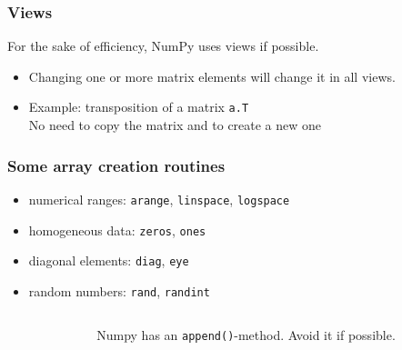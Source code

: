 \begin{frame}[fragile]\frametitle{Views}
 For the sake of efficiency, NumPy uses views if possible.

 \begin{itemize}
  \item Changing one or more matrix elements will change it in all views.
  \item Example: transposition of a matrix \lstinline{a.T}\\
        No need to copy the matrix and to create a new one
 \end{itemize}

\end{frame}

\begin{frame}[fragile]\frametitle{Some array creation routines}

 \begin{itemize}
  \item numerical ranges:
        \lstinline{arange}, \lstinline{linspace}, \lstinline{logspace}
  \item homogeneous data:
        \lstinline{zeros}, \lstinline{ones}
  \item diagonal elements:
        \lstinline{diag}, \lstinline{eye}
  \item random numbers:
        \lstinline{rand}, \lstinline{randint}
 \end{itemize}

 \vspace{0.3truecm}
 \begin{columns}
  \begin{column}{0.02\linewidth}
   \alert{\raisebox{1.0em}{}}
  \end{column}%
  \begin{column}{0.98\linewidth}
   \alert{Numpy has an \lstinline{append()}-method. Avoid it if possible.}
  \end{column}
 \end{columns}

 \vspace{0.3truecm}
\end{frame}

